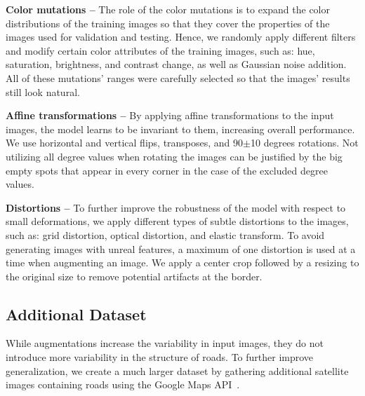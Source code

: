 \documentclass[10pt,conference,compsocconf]{IEEEtran}
\begin{document}
\noindent\textbf{Color mutations --} The role of the color mutations is to expand the color distributions of the training images so that they cover the properties of the images used for validation and testing. Hence, we randomly apply different filters and modify certain color attributes of the training images, such as: hue, saturation, brightness, and contrast change, as well as Gaussian noise addition. All of these mutations' ranges were carefully selected so that the images' results still look natural.

\noindent\textbf{Affine transformations --} By applying affine transformations to the input images, the model learns to be invariant to them, increasing overall performance. We use horizontal and vertical flips, transposes, and 90$\pm$10 degrees rotations. Not utilizing all degree values when rotating the images can be justified by the big empty spots that appear in every corner in the case of the excluded degree values. 

\noindent\textbf{Distortions --} To further improve the robustness of the model with respect to small deformations, we apply different types of subtle distortions to the images, such as: grid distortion, optical distortion, and elastic transform. To avoid generating images with unreal features, a maximum of one distortion is used at a time when augmenting an image. We apply a center crop followed by a resizing to the original size to remove potential artifacts at the border.

\subsection{Additional Dataset}
While augmentations increase the variability in input images, they do not introduce more variability in the structure of roads. To further improve generalization, we create a much larger dataset by gathering additional satellite images containing roads using the Google Maps API~\cite{google-maps-api}.
\end{document}
